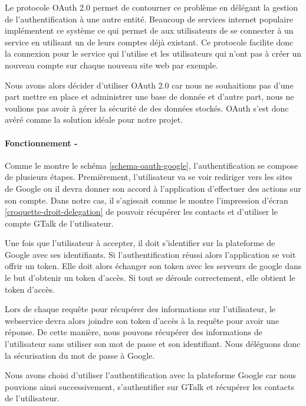 Le protocole OAuth 2.0 permet de contourner ce problème en délégant la gestion de l'authentification
à une autre entité. Beaucoup de services internet populaire implémentent ce système ce qui permet de 
aux utilisateurs de se connecter à un service en utilisant un de leurs comptes déjà existant. Ce 
protocole facilite donc la connexion pour le service qui l'utilise et les utilisateurs qui n'ont pas 
à créer un nouveau compte sur chaque nouveau site web par exemple.

Nous avons alors décider d'utiliser OAuth 2.0 car nous ne souhaitions pas d'une part mettre en place 
et administrer une base de donnée et d'autre part, nous ne voulions pas avoir à gérer la sécurité de 
des données stockés. OAuth s'est donc avéré comme la solution idéale pour notre projet.
\\

\paragraph{Fonctionnement -}

Comme le montre le schéma \ref{schema-oauth-google}, l'authentification se compose de plusieurs étapes.
Premièrement, l'utilisateur va se voir rediriger vers les sites de Google ou il devra donner son accord
à l'application d'effectuer des actions sur son compte. Dans notre cas, il s'agissait comme le montre
l'impression d'écran \ref{croquette-droit-delegation} de pouvoir récupérer les contacts et d'utiliser 
le compte GTalk de l'utilisateur.

Une fois que l'utilisateur à accepter, il doit s'identifier sur la plateforme de Google avec ses identifiants.
Si l'authentification réussi alors l'application se voit offrir un token. Elle doit alors échanger 
son token avec les serveurs de google dans le but d'obtenir un token d'accès. Si tout se déroule correctement,
elle obtient le token d'accès.

Lors de chaque requête pour récupérer des informations sur l'utilisateur, le webservice devra alors
joindre son token d'accès à la requête pour avoir une réponse. De cette manière, nous pouvons récupérer
des informations de l'utilisateur sans utiliser son mot de passe et son identifiant. Nous déléguons donc
la sécurisation du mot de passe à Google.

Nous avons choisi d'utiliser l'authentification avec la plateforme Google car nous pouvions ainsi 
successivement, s'authentifier sur GTalk et récupérer les contacts de l'utilisateur.
\\



